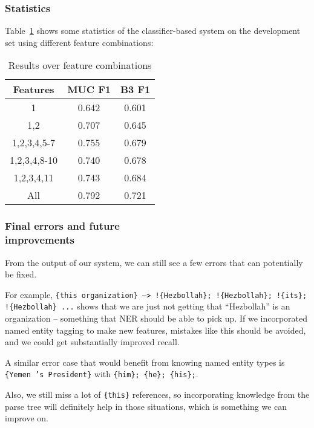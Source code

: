 \documentclass[12pt, twocolumn]{article}
\begin{document}
\subsubsection{Statistics}
Table~\ref{tab:features} shows some statistics of the classifier-based system on the development set using different feature combinations:
\begin{table}[H]
\begin{center}
\begin{tabular}{|c|c|c|}
\hline
Features & MUC F1 & B3 F1\\\hline
1 & 0.642 & 0.601 \\\hline
1,2 & 0.707 & 0.645 \\\hline
1,2,3,4,5-7 & 0.755 & 0.679\\\hline
1,2,3,4,8-10 & 0.740 & 0.678\\\hline
1,2,3,4,11 & 0.743 & 0.684 \\\hline
All & 0.792 & 0.721 \\\hline
\end{tabular}
\end{center}
\caption{Results over feature combinations}
\label{tab:features}
\end{table}
\subsubsection{Final errors and future\\ improvements}
From the output of our system, we can still see a few errors that can potentially be fixed.

For example, \texttt{\{this organization\} --> !\{Hezbollah\}; !\{Hezbollah\}; !\{its\}; !\{Hezbollah\} ...} shows that we are just not getting that ``Hezbollah'' is an organization -- something that NER should be able to pick up. If we incorporated named entity tagging to make new features, mistakes like this should be avoided, and we could get substantially improved recall.

A similar error case that would benefit from knowing named entity types is \texttt{\{Yemen 's President\}} with \texttt{\{him\}; \{he\}; \{his\};}.

Also, we still miss a lot of \texttt{\{this\}} references, so incorporating knowledge from the parse tree will definitely help in those situations, which is something we can improve on.
\end{document}
